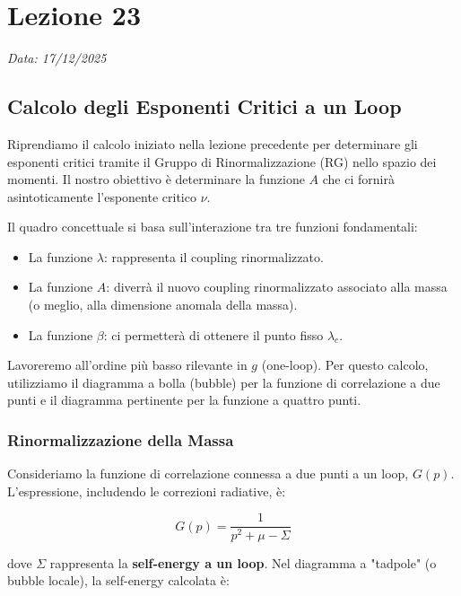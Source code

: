 \chapter{Lezione 23}
\label{chap:lezione_23}

\begin{flushright}
\textit{Data: 17/12/2025}
\end{flushright}


\section{Calcolo degli Esponenti Critici a un Loop}

Riprendiamo il calcolo iniziato nella lezione precedente per determinare gli esponenti critici tramite il Gruppo di Rinormalizzazione (RG) nello spazio dei momenti. Il nostro obiettivo è determinare la funzione $A$ che ci fornirà asintoticamente l'esponente critico $\nu$.

Il quadro concettuale si basa sull'interazione tra tre funzioni fondamentali:
\begin{itemize}
    \item La funzione $\lambda$: rappresenta il coupling rinormalizzato.
    \item La funzione $A$: diverrà il nuovo coupling rinormalizzato associato alla massa (o meglio, alla dimensione anomala della massa).
    \item La funzione $\beta$: ci permetterà di ottenere il punto fisso $\lambda_c$.
\end{itemize}


Lavoreremo all'ordine più basso rilevante in $g$ (one-loop). Per questo calcolo, utilizziamo il diagramma a bolla (bubble) per la funzione di correlazione a due punti e il diagramma pertinente per la funzione a quattro punti.

\subsection{Rinormalizzazione della Massa}

Consideriamo la funzione di correlazione connessa a due punti a un loop, $G(p)$. L'espressione, includendo le correzioni radiative, è:

\begin{equation}
G(p) = \frac{1}{p^2 + \mu - \Sigma}
\end{equation}

dove $\Sigma$ rappresenta la \textbf{self-energy a un loop}. Nel diagramma a "tadpole" (o bubble locale), la self-energy calcolata è:

